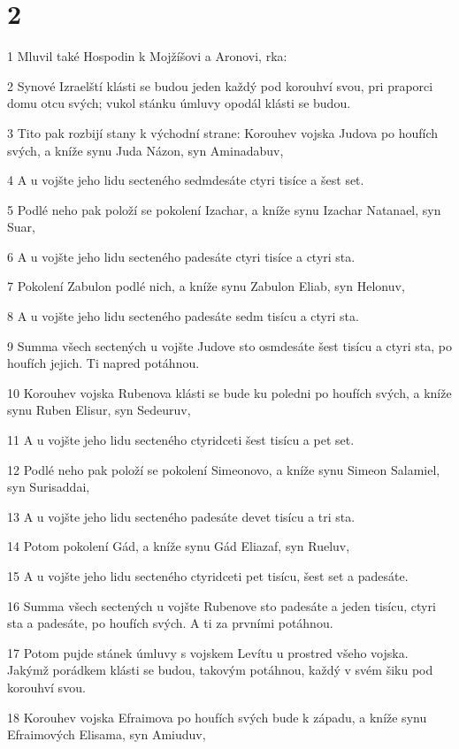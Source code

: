 \chapter{2}

\par 1 Mluvil také Hospodin k Mojžíšovi a Aronovi, rka:
\par 2 Synové Izraelští klásti se budou jeden každý pod korouhví svou, pri praporci domu otcu svých; vukol stánku úmluvy opodál klásti se budou.
\par 3 Tito pak rozbijí stany k východní strane: Korouhev vojska Judova po houfích svých, a kníže synu Juda Názon, syn Aminadabuv,
\par 4 A u vojšte jeho lidu secteného sedmdesáte ctyri tisíce a šest set.
\par 5 Podlé neho pak položí se pokolení Izachar, a kníže synu Izachar Natanael, syn Suar,
\par 6 A u vojšte jeho lidu secteného padesáte ctyri tisíce a ctyri sta.
\par 7 Pokolení Zabulon podlé nich, a kníže synu Zabulon Eliab, syn Helonuv,
\par 8 A u vojšte jeho lidu secteného padesáte sedm tisícu a ctyri sta.
\par 9 Summa všech sectených u vojšte Judove sto osmdesáte šest tisícu a ctyri sta, po houfích jejich. Ti napred potáhnou.
\par 10 Korouhev vojska Rubenova klásti se bude ku poledni po houfích svých, a kníže synu Ruben Elisur, syn Sedeuruv,
\par 11 A u vojšte jeho lidu secteného ctyridceti šest tisícu a pet set.
\par 12 Podlé neho pak položí se pokolení Simeonovo, a kníže synu Simeon Salamiel, syn Surisaddai,
\par 13 A u vojšte jeho lidu secteného padesáte devet tisícu a tri sta.
\par 14 Potom pokolení Gád, a kníže synu Gád Eliazaf, syn Rueluv,
\par 15 A u vojšte jeho lidu secteného ctyridceti pet tisícu, šest set a padesáte.
\par 16 Summa všech sectených u vojšte Rubenove sto padesáte a jeden tisícu, ctyri sta a padesáte, po houfích svých. A ti za prvními potáhnou.
\par 17 Potom pujde stánek úmluvy s vojskem Levítu u prostred všeho vojska. Jakýmž porádkem klásti se budou, takovým potáhnou, každý v svém šiku pod korouhví svou.
\par 18 Korouhev vojska Efraimova po houfích svých bude k západu, a kníže synu Efraimových Elisama, syn Amiuduv,
